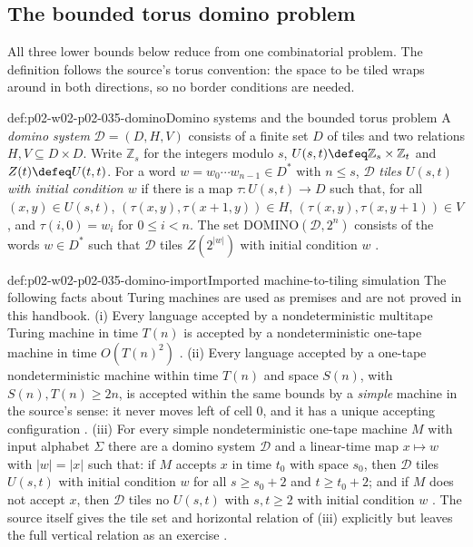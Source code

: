 \subsection{The bounded torus domino problem}
\label{sec:p02-w02-p02-035-domino}

All three lower bounds below reduce from one combinatorial problem.  The
definition follows the source's torus convention: the space to be tiled wraps
around in both directions, so no border conditions are needed.

\begin{hbdefinition}{def:p02-w02-p02-035-domino}{Domino systems and the bounded torus problem}
A \emph{domino system} \(\mathcal D=(D,H,V)\) consists of a finite set \(D\)
of tiles and two relations \(H,V\subseteq D\times D\).  Write
\(\mathbb Z_s\) for the integers modulo \(s\), \(U(s,t)\defeq
\mathbb Z_s\times\mathbb Z_t\) and \(Z(t)\defeq U(t,t)\).  For a word
\(w=w_0\cdots w_{n-1}\in D^{*}\) with \(n\leq s\), \(\mathcal D\)
\emph{tiles \(U(s,t)\) with initial condition \(w\)} if there is a map
\(\tau:U(s,t)\to D\) such that, for all \((x,y)\in U(s,t)\),
\((\tau(x,y),\tau(x+1,y))\in H\), \((\tau(x,y),\tau(x,y+1))\in V\), and
\(\tau(i,0)=w_i\) for \(0\leq i<n\).  The set
\(\mathrm{DOMINO}(\mathcal D,2^n)\) consists of the words \(w\in D^{*}\) such
that \(\mathcal D\) tiles \(Z(2^{\lvert w\rvert})\) with initial condition
\(w\) \cite[defs.~6.1.1 and 6.1.5]{BorgerGradelGurevich1997}.
\end{hbdefinition}

\begin{proofboundary}{def:p02-w02-p02-035-domino-import}{Imported machine-to-tiling simulation}
The following facts about Turing machines are used as premises and are not
proved in this handbook.  (i) Every language accepted by a nondeterministic
multitape Turing machine in time \(T(n)\) is accepted by a nondeterministic
one-tape machine in time \(O(T(n)^2)\)
\cite[p.~246]{BorgerGradelGurevich1997}.  (ii) Every language accepted by a
one-tape nondeterministic machine within time \(T(n)\) and space \(S(n)\), with
\(S(n),T(n)\geq 2n\), is accepted within the same bounds by a \emph{simple}
machine in the source's sense: it never moves left of cell \(0\), and it has a
unique accepting configuration \cite[p.~243]{BorgerGradelGurevich1997}.
(iii) For every simple nondeterministic one-tape machine \(M\) with input
alphabet \(\Sigma\) there are a domino system \(\mathcal D\) and a linear-time
map \(x\mapsto w\) with \(\lvert w\rvert=\lvert x\rvert\) such that: if \(M\)
accepts \(x\) in time \(t_0\) with space \(s_0\), then \(\mathcal D\) tiles
\(U(s,t)\) with initial condition \(w\) for all \(s\geq s_0+2\) and
\(t\geq t_0+2\); and if \(M\) does not accept \(x\), then \(\mathcal D\) tiles
no \(U(s,t)\) with \(s,t\geq2\) with initial condition \(w\)
\cite[thm.~6.1.2]{BorgerGradelGurevich1997}.  The source itself gives the
tile set and horizontal relation of (iii) explicitly but leaves the full
vertical relation as an exercise \cite[pp.~244--245]{BorgerGradelGurevich1997}.
\end{proofboundary}


